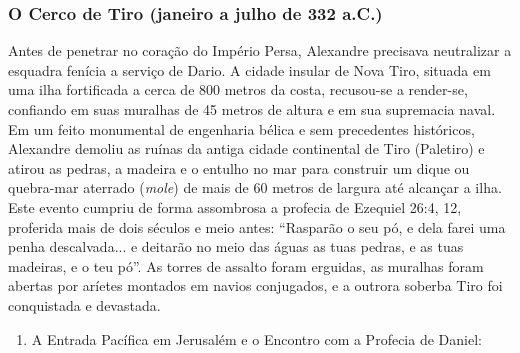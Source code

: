 \documentclass[11pt,a4paper,openany]{book}
\begin{document}
\subsubsection*{O Cerco de Tiro (janeiro a julho de 332 a.C.)}
Antes de penetrar no coração do Império Persa, Alexandre precisava neutralizar a esquadra fenícia a serviço de Dario. A cidade insular de Nova Tiro, situada em uma ilha fortificada a cerca de 800 metros da costa, recusou-se a render-se, confiando em suas muralhas de 45 metros de altura e em sua supremacia naval. Em um feito monumental de engenharia bélica e sem precedentes históricos, Alexandre demoliu as ruínas da antiga cidade continental de Tiro (Paletiro) e atirou as pedras, a madeira e o entulho no mar para construir um dique ou quebra-mar aterrado (\textit{mole}) de mais de 60 metros de largura até alcançar a ilha. Este evento cumpriu de forma assombrosa a profecia de Ezequiel 26:4, 12, proferida mais de dois séculos e meio antes: ``Rasparão o seu pó, e dela farei uma penha descalvada... e deitarão no meio das águas as tuas pedras, e as tuas madeiras, e o teu pó''. As torres de assalto foram erguidas, as muralhas foram abertas por aríetes montados em navios conjugados, e a outrora soberba Tiro foi conquistada e devastada.

\begin{enumerate}
  \item A Entrada Pacífica em Jerusalém e o Encontro com a Profecia de Daniel:
\end{enumerate}
\end{document}
